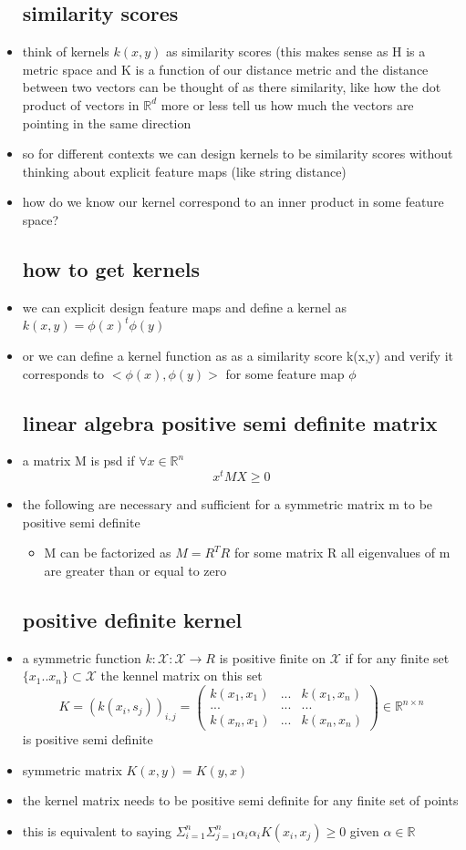 \documentclass{article}
\begin{document}
\begin{itemize}
\subsection{similarity scores}
\item think of kernels $k(x,y)$ as similarity scores (this makes sense as H is a metric space and K is a function of our distance metric and the distance between two vectors can be thought of as there similarity, like how the dot product of vectors in $\mathbb{R}^{d}$ more or less tell us how much the vectors are pointing in the same direction 
\item so for different contexts we can design kernels to be similarity scores without thinking about explicit feature maps (like string distance) 
\item how do we know our kernel correspond to an inner product in some feature space? 
\subsection{how to get kernels}
\item we can explicit design feature maps and define a kernel as $k(x,y)=\phi(x)^t\phi(y)$
\item or we can define a kernel function as as a similarity score k(x,y) and verify it corresponds to $<\phi(x),\phi(y)>$ for some feature map $\phi$
\subsection{linear algebra positive semi definite matrix}
\item a matrix M is psd if $\forall x\in \mathbb{R}^{n}$ $$x^tMX\geq 0$$
\item the following are necessary and sufficient for a symmetric matrix m to be positive semi definite
\begin{itemize}
    \item M can be factorized as $M=R^TR$ for some matrix R
    \imte all eigenvalues of m are greater than or equal to zero
\end{itemize}
\subsection{positive definite kernel}
\item a symmetric function $k: \mathcal{X}:\mathcal{X}\rightarrow R$ is positive finite on $\mathcal{X}$ if for any finite set $\{x_1..x_n\}\subset\mathcal{X}$ the kennel matrix on this set $$K=(k(x_i,s_j))_{i,j}=\begin{pmatrix}
    k(x_1,x_1)&...&k(x_1,x_n)\\
    ...&...&...\\
    k(x_n,x_1)&...&k(x_n,x_n)
\end{pmatrix} \in \mathbb{R}^{n\times n}$$  is positive semi definite 
\item symmetric matrix $K(x,y)=K(y,x)$
\item the kernel matrix needs to be positive semi definite for any finite set of points 
\item this is equivalent to saying $\Sigma_{i=1}^{n}\Sigma_{j=1}^{n}\alpha_{i}\alpha_{i}K(x_i,x_j)\geq 0$ given $\alpha \in \mathbb{R}$

\end{itemize}
\end{document}
